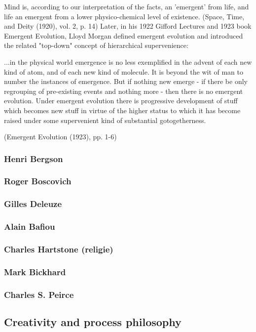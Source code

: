 \documentclass[a4paper]{Thesis}
\begin{document}
	Mind is, according to our interpretation of the facts, an 'emergent' from life, and life an emergent from a lower physico-chemical level of existence.
	(Space, Time, and Deity (1920), vol. 2, p. 14)
	Later, in his 1922 Gifford Lectures and 1923 book Emergent Evolution, Lloyd Morgan defined emergent evolution and introduced the related "top-down" concept of hierarchical supervenience:
	
	...in the physical world emergence is no less exemplified in the advent of each new kind of atom, and of each new kind of molecule. It is beyond the wit of man to number the instances of emergence. But if nothing new emerge - if there be only regrouping of pre-existing events and nothing more - then there is no emergent evolution.
	Under emergent evolution there is progressive development of stuff which becomes new stuff in virtue of the higher status to which it has become raised under some supervenient kind of substantial gotogetherness.
	
	(Emergent Evolution (1923), pp. 1-6)
	
	\subsubsection{Henri Bergson}
	\subsubsection{Roger Boscovich}
	\subsubsection{Gilles Deleuze}
	\subsubsection{Alain Bafiou}
	\subsubsection{Charles Hartstone (religie)}
	\subsubsection{Mark Bickhard}
	\subsubsection{Charles S. Peirce}
	
	\subsection{Creativity and process philosophy}
\end{document}
